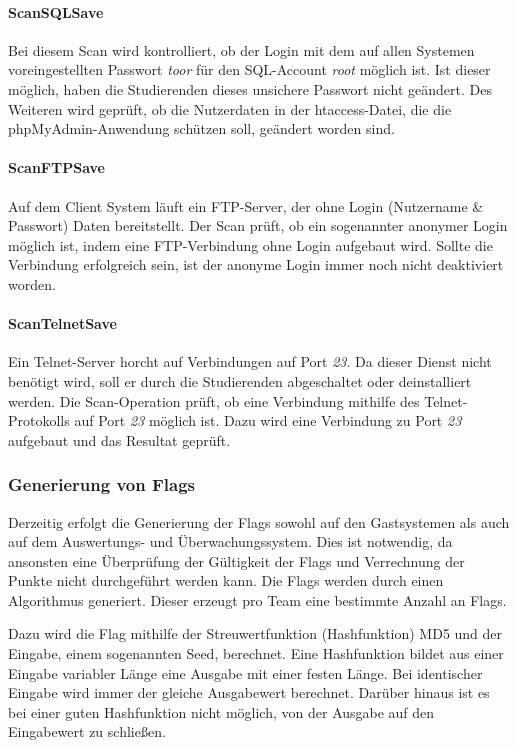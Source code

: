 \paragraph{ScanSQLSave}\label{para:ScanSQLSave}
Bei diesem Scan wird kontrolliert, ob der Login mit dem auf allen Systemen voreingestellten Passwort \textit{toor} für den SQL-Account \textit{root} möglich ist. Ist dieser möglich, haben die Studierenden dieses unsichere Passwort nicht geändert. Des Weiteren wird geprüft, ob die Nutzerdaten in der htaccess-Datei, die die phpMyAdmin-Anwendung schützen soll, geändert worden sind.

\paragraph{ScanFTPSave}\label{para:ScanFTPSave}
Auf dem Client System läuft ein FTP-Server, der ohne Login (Nutzername \& Passwort) Daten bereitstellt. Der Scan prüft, ob ein sogenannter anonymer Login möglich ist, indem eine FTP-Verbindung ohne Login aufgebaut wird. Sollte die Verbindung erfolgreich sein, ist der anonyme Login immer noch nicht deaktiviert worden.

\paragraph{ScanTelnetSave}\label{para:ScanTelnetSave}
Ein Telnet-Server horcht auf Verbindungen auf Port \textit{23}. Da dieser Dienst nicht benötigt wird, soll er durch die Studierenden abgeschaltet oder deinstalliert werden. Die Scan-Operation prüft, ob eine Verbindung mithilfe des Telnet-Protokolls auf Port \textit{23} möglich ist. Dazu wird eine Verbindung zu Port \textit{23} aufgebaut und das Resultat geprüft.

\subsubsection{Generierung von Flags}\label{subsubsec:Generierung_von_Flags}

Derzeitig erfolgt die Generierung der Flags sowohl auf den Gastsystemen als auch auf dem Auswertungs- und Überwachungssystem. Dies ist notwendig, da ansonsten eine Überprüfung der Gültigkeit der Flags und Verrechnung der Punkte nicht durchgeführt werden kann. Die Flags werden durch einen Algorithmus generiert. Dieser erzeugt pro Team eine bestimmte Anzahl an Flags. 

Dazu wird die Flag mithilfe der Streuwertfunktion (Hashfunktion) MD5 und der Eingabe, einem sogenannten Seed, berechnet. Eine Hashfunktion bildet aus einer Eingabe variabler Länge eine Ausgabe mit einer festen Länge. Bei identischer Eingabe wird immer der gleiche Ausgabewert berechnet. Darüber hinaus ist es bei einer guten Hashfunktion nicht möglich, von der Ausgabe auf den Eingabewert zu schließen. \cite{menezesHandbookAppliedCryptography1996}

